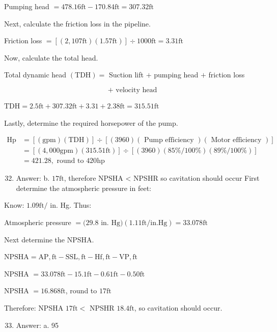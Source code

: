 \documentclass[10pt]{article}
\begin{document}
Pumping head $=478.16 \mathrm{ft}-170.84 \mathrm{ft}=307.32 \mathrm{ft}$

Next, calculate the friction loss in the pipeline.

Friction loss $=[(2,107 \mathrm{ft})(1.57 \mathrm{ft})] \div 1000 \mathrm{ft}=3.31 \mathrm{ft}$

Now, calculate the total head.

Total dynamic head $(\mathrm{TDH})=$ Suction lift $+$ pumping head $+$ friction loss

$$
\text { + velocity head }
$$

$\mathrm{TDH}=2.5 \mathrm{ft}+307.32 \mathrm{ft}+3.31+2.38 \mathrm{ft}=315.51 \mathrm{ft}$

Lastly, determine the required horsepower of the pump.

$$
\begin{aligned}
\mathrm{Hp} &=[(\mathrm{gpm})(\mathrm{TDH})] \div[(3960)(\text { Pump efficiency })(\text { Motor efficiency })] \\
&=[(4,000 \mathrm{gpm})(315.51 \mathrm{ft})] \div[(3960)(85 \% / 100 \%)(89 \% / 100 \%)] \\
&=421.28, \text { round to } 420 \mathrm{hp}
\end{aligned}
$$

\begin{enumerate}
  \setcounter{enumi}{31}
  \item Answer: b. $17 \mathrm{ft}$, therefore NPSHA < NPSHR so cavitation should occur First determine the atmospheric pressure in feet:
\end{enumerate}

Know: $1.09 \mathrm{ft} /$ in. Hg. Thus:

Atmospheric pressure $=(29.8$ in. $\mathrm{Hg})(1.11 \mathrm{ft} / \mathrm{in} . \mathrm{Hg})=33.078 \mathrm{ft}$

Next determine the NPSHA.

$\mathrm{NPSHA}=\mathrm{AP}, \mathrm{ft}-\mathrm{SSL}, \mathrm{ft}-\mathrm{Hf}, \mathrm{ft}-\mathrm{VP}, \mathrm{ft}$

NPSHA $=33.078 \mathrm{ft}-15.1 \mathrm{ft}-0.61 \mathrm{ft}-0.50 \mathrm{ft}$

NPSHA $=16.868 \mathrm{ft}$, round to $17 \mathrm{ft}$

Therefore: NPSHA $17 \mathrm{ft}<$ NPSHR $18.4 \mathrm{ft}$, so cavitation should occur.

\begin{enumerate}
  \setcounter{enumi}{32}
  \item Answer: a. 95
\end{enumerate}
\end{document}
